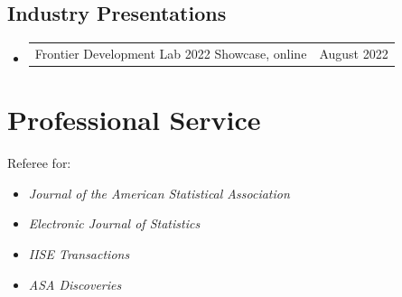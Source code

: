 \documentclass[11pt]{article}
\makeatletter
\newcommand{\cvrow}[2]{%
  \begin{tabularx}{\textwidth}{@{}Xr@{}}#1 & #2\end{tabularx}}
\makeatother
\begin{document}
\subsection*{Industry Presentations}
\begin{itemize}
  \item \cvrow{Frontier Development Lab 2022 Showcase, online}{August 2022}
\end{itemize}

\section{Professional Service}

Referee for:
\begin{itemize}[leftmargin=1.5em,label=\textbullet]
  \item \textit{Journal of the American Statistical Association}
  \item \textit{Electronic Journal of Statistics}
  \item \textit{IISE Transactions}
  \item \textit{ASA Discoveries}
\end{itemize}
\end{document}
